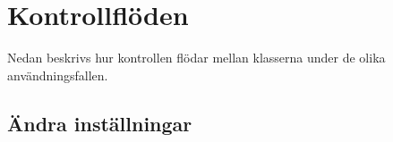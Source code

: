 \documentclass{article}
\begin{document}
\begin{figure}[h!tb]
  \centering
\end{figure}

\section{Kontrollflöden}

Nedan beskrivs hur kontrollen flödar mellan klasserna under de olika användningsfallen.

\subsection{Ändra inställningar}
\end{document}
